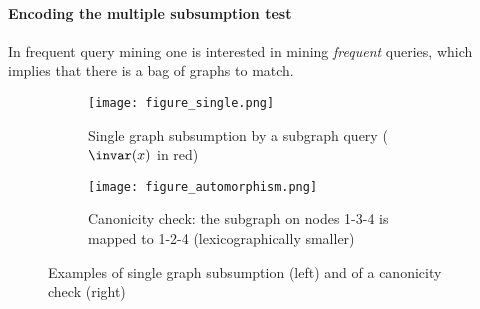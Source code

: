 \paragraph{Encoding the multiple subsumption test}
In frequent query mining one is interested in mining \textit{frequent} queries, which implies that there is a bag of graphs to match. 

\begin{figure}[t]
  \begin{center}
    
  \begin{subfigure}{.44\textwidth}
    \captionsetup{
    }
    \begin{center}
      \texttt{[image: figure\_single.png]}
      \caption{Single graph subsumption by a subgraph query ($\invar(x)$ in red)}
      \label{fig:single}
    \end{center}
    \hfill 
  \end{subfigure}
    \begin{subfigure}{.44\textwidth}
    \captionsetup{
    }
    \begin{center}

      \texttt{[image: figure\_automorphism.png]}
      \caption{Canonicity check: the subgraph on nodes 1-3-4 is mapped to 1-2-4 (lexicographically smaller)}
      \label{fig:automorphism}
    \end{center}
  \end{subfigure}
 
    \captionsetup{
    }
  \caption{Examples of single graph subsumption (left) and of a canonicity check (right)}
  \end{center}
\end{figure}
  
